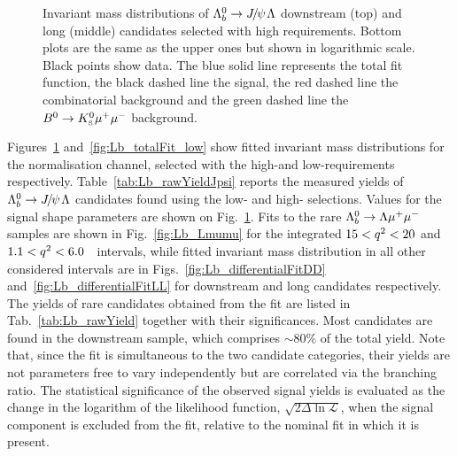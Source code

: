 \begin{figure}
\caption{Invariant mass distributions of $\Lb\ra\jpsi\Lz$ downstream (top) and long (middle) candidates
selected with high \qsq requirements.
Bottom plots are the same as the upper ones but shown in logarithmic scale. Black points show data.
The blue solid line represents the total fit function, the black dashed line the signal, the red dashed line
the combinatorial background and the green dashed line the $B^0\rightarrow K^0_{\rm\scriptscriptstyle S}\mu^+\mu^-$ background.}
\label{fig:Lb_totalFit}
\end{figure}
%
Figures~\ref{fig:Lb_totalFit} and~\ref{fig:Lb_totalFit_low} show fitted invariant mass distributions for
the normalisation channel, selected with the high-\qsq and low-\qsq requirements respectively.
Table~\ref{tab:Lb_rawYieldJpsi} reports the measured yields of $\Lb\ra\jpsi\Lz$ candidates found using the low- 
and \mbox{high-\qsq} selections. Values for the signal shape parameters are shown on Fig.~\ref{fig:Lb_totalFit}.
Fits to the rare $\Lambda^0_b\rightarrow\Lambda\mu^+\mu^-$ samples are shown in Fig.~\ref{fig:Lb_Lmumu} for the integrated
$15 < q^2 < 20$ and $1.1 < q^2 < 6.0$~\gevgevcccc ~\qsq intervals, while
fitted invariant mass distribution in all other considered \qsq intervals are in Figs.~\ref{fig:Lb_differentialFitDD}
and~\ref{fig:Lb_differentialFitLL} for downstream and long candidates respectively.
The yields of rare candidates obtained from the fit are listed in Tab.~\ref{tab:Lb_rawYield} together with their significances.
Most candidates are found in the downstream sample, which comprises $\sim 80\%$ of the total yield.
Note that, since the fit is simultaneous to the two candidate categories, their yields
are not parameters free to vary independently but are correlated via the branching ratio.
The statistical significance of the observed signal yields is evaluated as the change in the logarithm 
of the likelihood function, $\sqrt{2\Delta\ln{\mathcal{L}}}$, when the signal component
is excluded from the fit, relative to the nominal fit in which it is present.

\begin{table}
\centering
\caption{Number of \decay{\Lb}{\jpsi\Lz} candidates in the downstream and
  long categories found using the for low- and
  high-\qsq requirements; uncertainties are statistical only.}
\label{tab:Lb_rawYieldJpsi}
\end{table}

